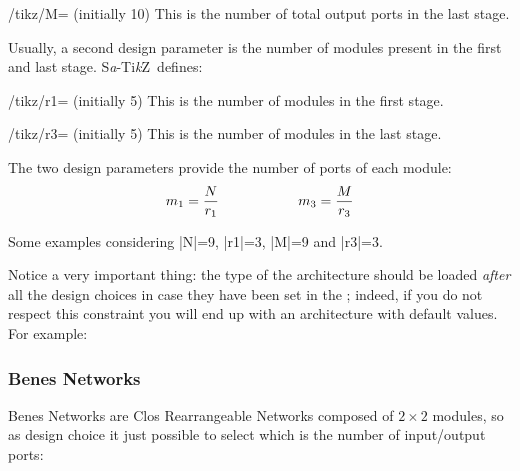 \documentclass{ltxdoc}
\newcommand\Tikz{Ti\textit kZ}
\newcommand{\saTikZ}{S\textit{a}-\Tikz}
\begin{document}
\begin{key}{/tikz/M= (initially 10)}
    This is the number of total output ports in the last stage.
\end{key}

Usually, a second design parameter is the number of modules present in the first and last stage. \saTikZ\ defines:

\begin{key}{/tikz/r1= (initially 5)}
    This is the number of modules in the first stage.
\end{key}

\begin{key}{/tikz/r3= (initially 5)}
    This is the number of modules in the last stage.
\end{key}

The two design parameters provide the number of ports of each module:
\[m_1=\dfrac{N}{r_1} \hspace*{2cm} m_3=\dfrac{M}{r_3} \]

Some examples considering |N|=9, |r1|=3, |M|=9 and |r3|=3.
\begin{codeexample}[]
\begin{tikzpicture}
    \node[N=9,r1=3,M=9,r3=3,clos rear] {};
\end{tikzpicture}
\end{codeexample}

\begin{codeexample}[]
\begin{tikzpicture}
    \node[N=9,r1=3,M=9,r3=3,clos snb] {};
\end{tikzpicture}
\end{codeexample}

Notice a very important thing: the type of the architecture should be loaded \emph{after} all the design choices in case they have been set in the ; indeed, if you do not respect this constraint you will end up with an architecture with default values. For example:

\begin{codeexample}[]
\begin{tikzpicture}
    \node[clos rear,N=9,r1=3,M=9,r3=3] {};
\end{tikzpicture}
\end{codeexample}

\subsubsection{Benes Networks}
\label{subsubsec:benes}
Benes Networks are Clos Rearrangeable Networks composed of $2 \times 2$ modules, so as design choice it just possible to select which is the number of input/output ports:
\end{document}
